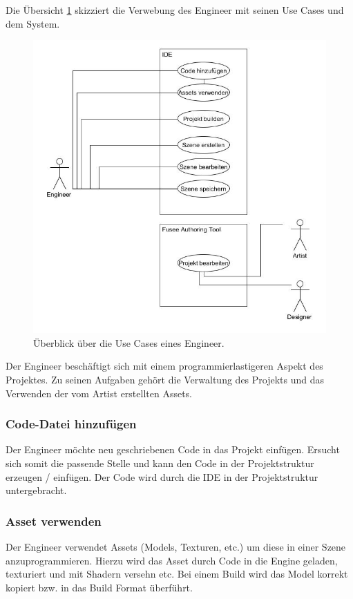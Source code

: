 \documentclass[pagesize, paper=a4, fontsize=12pt, titlepage=true, headings=small, headnosepline, abstractoff, liststotoc, nochapterprefix, plainheadsepline, twoside]{scrreprt}
\begin{document}
Die Übersicht \ref{UseCaseEngineer} skizziert die Verwebung des Engineer mit seinen Use Cases und dem System.
\begin{figure}[ht]
	\centering
	\includegraphics[width=\linewidth]{Bilder/UseCase_Engineer.jpg}
	\caption{Überblick über die Use Cases eines Engineer.}
	\label{UseCaseEngineer}
\end{figure}

Der Engineer beschäftigt sich mit einem programmierlastigeren Aspekt des Projektes. Zu seinen Aufgaben gehört die Verwaltung des Projekts und das Verwenden der vom Artist erstellten Assets.

\subsubsection{Code-Datei hinzufügen}
Der Engineer möchte neu geschriebenen Code in das Projekt einfügen. Ersucht sich somit die passende Stelle und kann den Code in der Projektstruktur erzeugen / einfügen. Der Code wird durch die IDE in der Projektstruktur untergebracht.

\subsubsection{Asset verwenden}
Der Engineer verwendet Assets (Models, Texturen, etc.) um diese in einer Szene anzuprogrammieren. Hierzu wird das Asset durch Code in die Engine geladen, texturiert und mit Shadern versehn etc. Bei einem Build wird das Model korrekt kopiert bzw. in das Build Format überführt.
\end{document}
